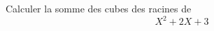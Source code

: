 Calculer la somme des cubes des racines de
\begin{displaymath}
 X^2+2X+3
\end{displaymath}
\bigskip
